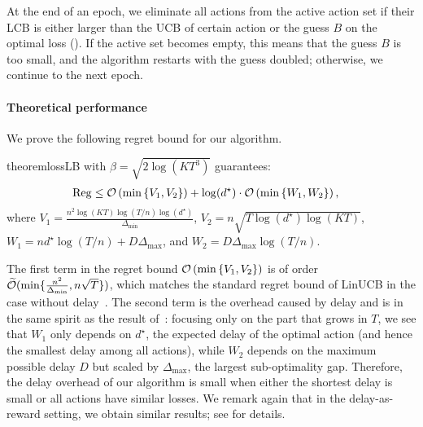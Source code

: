 At the end of an epoch, we eliminate all actions from the active action set if their LCB is either larger than the UCB of certain action or the guess $B$ on the optimal loss  (). 
If the active set becomes empty, this means that the guess $B$ is too small, and the algorithm restarts with the guess doubled; 
otherwise, we continue to the next epoch.

\paragraph{Theoretical performance}
We prove the following regret bound for our algorithm. 
\begin{restatable}{theorem}{lossLB}
\label{thm:main-non-contextual}
     with $\beta=\sqrt{2\log(KT^3)}$ guarantees: 
\begin{align*}
        {\mathrm{Reg}} &\leq \mathcal{O}\left(\min\left\{V_1,V_2\right\}\right) + \log(d^\star)\cdot \mathcal{O}\left( \min\left\{W_1,W_2\right\}\right),
    \end{align*}
    where $V_1=\frac{n^2\log(KT)\log(T/n)\log(d^\star)}{\Delta_{\min}}$, $V_2=n\sqrt{T\log(d^\star)\log(KT)}$, $W_1=nd^\star\log (T/n)+D\Delta_{\max}$, and $W_2=D\Delta_{\max}\log (T/n)$. 
\end{restatable}
The first term in the regret bound $\mathcal{O}\left(\min\left\{V_1,V_2\right\}\right)$ is of order $\widetilde{\mathcal{O}}(\min\{\frac{n^2}{\Delta_{\min}}, n\sqrt{T}\})$, which matches the standard regret bound of LinUCB in the case without delay~\citep{abbasi2011improved}.
The second term is the overhead caused by delay and is in the same spirit as the result of~\citet{schlisselberg2024delay}:
focusing only on the part that grows in $T$, 
we see that $W_1$ only depends on $d^\star$, the expected delay of the optimal action (and hence the smallest delay among all actions),
while $W_2$ depends on the maximum possible delay $D$ but scaled by $\Delta_{\max}$, the largest sub-optimality gap.
Therefore, the delay overhead of our algorithm is small when either the shortest delay is small or all actions have similar losses.
We remark again that in the delay-as-reward setting, we obtain similar results; see  for details.










